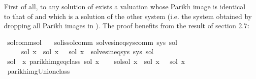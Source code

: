 \begin{isabellebody}
\begin{isamarkuptext}
First of all, to any solution  of  exists a valuation whose Parikh image is
identical to that of  and which is a solution of the other system (i.e. the system obtained
by dropping all Parikh images in ). The proof benefits from the result of section 2.7:%
\end{isamarkuptext}\isamarkuptrue%
\isamarkupfalse%
\ sol{\isacharunderscore}{\kern0pt}comm{\isacharunderscore}{\kern0pt}sol{\isacharcolon}{\kern0pt}\isanewline
\ \ \ sol{\isacharunderscore}{\kern0pt}is{\isacharunderscore}{\kern0pt}sol{\isacharunderscore}{\kern0pt}comm{\isacharcolon}{\kern0pt}\ {\isachardoublequoteopen}solves{\isacharunderscore}{\kern0pt}ineq{\isacharunderscore}{\kern0pt}sys{\isacharunderscore}{\kern0pt}comm\ sys\ sol{\isachardoublequoteclose}\isanewline
\ \ \ \ \ {\isachardoublequoteopen}{\isasymexists}sol{\isacharprime}{\kern0pt}{\isachardot}{\kern0pt}\ {\isacharparenleft}{\kern0pt}{\isasymforall}x{\isachardot}{\kern0pt}\ {\isasymPsi}\ {\isacharparenleft}{\kern0pt}sol\ x{\isacharparenright}{\kern0pt}\ {\isacharequal}{\kern0pt}\ {\isasymPsi}\ {\isacharparenleft}{\kern0pt}sol{\isacharprime}{\kern0pt}\ x{\isacharparenright}{\kern0pt}{\isacharparenright}{\kern0pt}\ {\isasymand}\ solves{\isacharunderscore}{\kern0pt}ineq{\isacharunderscore}{\kern0pt}sys\ sys\ sol{\isacharprime}{\kern0pt}{\isachardoublequoteclose}\isanewline
%
\isadelimproof
%
\endisadelimproof
%
\isatagproof
{}\isamarkupfalse%
\isanewline
\ \ \isamarkupfalse%
\ {\isacharquery}{\kern0pt}sol{\isacharprime}{\kern0pt}\ {\isacharequal}{\kern0pt}\ {\isachardoublequoteopen}{\isasymlambda}x{\isachardot}{\kern0pt}\ {\isasymUnion}{\isacharparenleft}{\kern0pt}parikh{\isacharunderscore}{\kern0pt}img{\isacharunderscore}{\kern0pt}eq{\isacharunderscore}{\kern0pt}class\ {\isacharparenleft}{\kern0pt}sol\ x{\isacharparenright}{\kern0pt}{\isacharparenright}{\kern0pt}{\isachardoublequoteclose}\isanewline
\ \ \isamarkupfalse%
\ sol{\isacharprime}{\kern0pt}{\isacharunderscore}{\kern0pt}sol{\isacharcolon}{\kern0pt}\ {\isachardoublequoteopen}{\isasymforall}x{\isachardot}{\kern0pt}\ {\isasymPsi}\ {\isacharparenleft}{\kern0pt}{\isacharquery}{\kern0pt}sol{\isacharprime}{\kern0pt}\ x{\isacharparenright}{\kern0pt}\ {\isacharequal}{\kern0pt}\ {\isasymPsi}\ {\isacharparenleft}{\kern0pt}sol\ x{\isacharparenright}{\kern0pt}{\isachardoublequoteclose}\isanewline
\ \ \ \ \ \ \isamarkupfalse%
\ parikh{\isacharunderscore}{\kern0pt}img{\isacharunderscore}{\kern0pt}Union{\isacharunderscore}{\kern0pt}class\ \isamarkupfalse%

\end{isabellebody}
